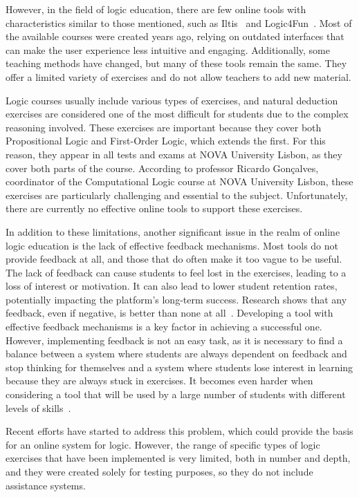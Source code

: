 However, in the field of logic education, there are few online tools with characteristics similar to those mentioned, such as Iltis~\cite{geck_iltis, geck_2018_introduction} and Logic4Fun~\cite{slaney_logic}. Most of the available courses were created years ago, relying on outdated interfaces that can make the user experience less intuitive and engaging. Additionally, some teaching methods have changed, but many of these tools remain the same. They offer a limited variety of exercises and do not allow teachers to add new material.

Logic courses usually include various types of exercises, and natural deduction exercises are considered one of the most difficult for students due to the complex reasoning involved. These exercises are important because they cover both Propositional Logic and First-Order Logic, which extends the first. For this reason, they appear in all tests and exams at NOVA University Lisbon, as they cover both parts of the course. According to professor Ricardo Gonçalves, coordinator of the Computational Logic course at NOVA University Lisbon, these exercises are particularly challenging and essential to the subject. Unfortunately, there are currently no effective online tools to support these exercises.

In addition to these limitations, another significant issue in the realm of online logic education is the lack of effective feedback mechanisms. Most tools do not provide feedback at all, and those that do often make it too vague to be useful. The lack of feedback can cause students to feel lost in the exercises, leading to a loss of interest or motivation. It can also lead to lower student retention rates, potentially impacting the platform's long-term success. Research shows that any feedback, even if negative, is better than none at all~\cite{Zhu2022AnyFI}. Developing a tool with effective feedback mechanisms is a key factor in achieving a successful one. However, implementing feedback is not an easy task, as it is necessary to find a balance between a system where students are always dependent on feedback and stop thinking for themselves and a system where students lose interest in learning because they are always stuck in exercises. It becomes even harder when considering a tool that will be used by a large number of students with different levels of skills~\cite{Cavalcanti2019AnAO}.

Recent efforts have started to address this problem, which could provide the basis for an online system for logic. However, the range of specific types of logic exercises that have been implemented is very limited, both in number and depth, and they were created solely for testing purposes, so they do not include assistance systems.

